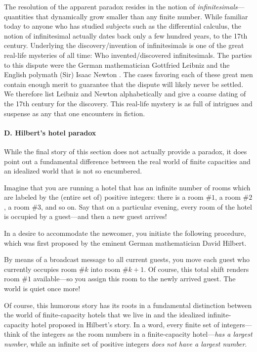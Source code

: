 The resolution of the apparent paradox resides in the notion of
 {\em infinitesimals}---quantities that
dynamically grow smaller than any finite number.  While familiar today
to anyone who has studied subjects such as the differential calculus,
the notion of infinitesimal actually dates back only a few hundred
years, to the 17th century.  Underlying the discovery/invention of
infinitesimals is one of the great real-life mysteries of all time:
Who invented/discovered infinitesimals.  The parties to this dispute
were the German mathematician Gottfried Leibniz \cite{Leibniz}
 and the English polymath
(Sir) Isaac Newton \cite{Newton}.   The cases
favoring each of these great men contain enough merit to guarantee
that the dispute will likely never be settled.  We therefore list
Leibniz and Newton alphabetically and give a coarse dating of the 17th
century for the discovery.  This real-life mystery is as full of
intrigues and suspense as any that one encounters in fiction.


\paragraph{\small\sf D. Hilbert's hotel paradox}

While the final story of this section does not actually provide a
paradox, it does point out a fundamental difference between the real
world of finite capacities and an idealized world that is not so
encumbered.

Imagine that you are running a hotel that has an infinite number of
rooms which are labeled by the (entire set of) positive integers:
there is a room \#$1$, a room \#$2$, a room \#$3$, and so on.  Say
that on a particular evening, every room of the hotel is occupied by a
guest---and then a new guest arrives!

In a desire to accommodate the newcomer, you initiate the following
procedure, which was first proposed by the eminent German
mathematician David Hilbert. 

By means of a broadcast message to all current guests, you move each
guest who currently occupies room \#$k$ into room \#$k+1$.  Of course,
this total shift renders room \#$1$ available---so you assign this
room to the newly arrived guest.  The world is quiet once more!

Of course, this humorous story has its roots in a fundamental
distinction between the world of finite-capacity hotels that we live
in and the idealized infinite-capacity hotel proposed in Hilbert's
story.  In a word, every finite set of integers---think of the
integers as the room numbers in a finite-capacity hotel---{\em has a
  largest number}, while an infinite set of positive integers {\em
  does not have a largest number}.


